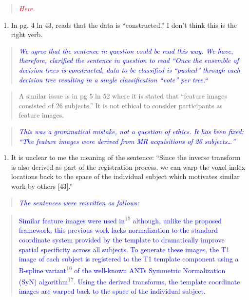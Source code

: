 \documentclass[12pt,]{article}
\providecommand{\tightlist}{%
  \setlength{\itemsep}{0pt}\setlength{\parskip}{0pt}}
\begin{document}
\begin{quote}
\emph{\textcolor{red}{Here.}}
\end{quote}

\begin{enumerate}
\def\labelenumi{\arabic{enumi}.}
\setcounter{enumi}{9}
\tightlist
\item
  In pg. 4 ln 43, reads that the data is ``constructed.'' I don't think
  this is the right verb.
\end{enumerate}

\begin{quote}
\emph{\textcolor{blue}{We agree that the sentence in question could be read this way.
We have, therefore, clarified the sentence in question to read
``Once the ensemble of decision trees is constructed, data to be classified is ``pushed''
through each decision tree resulting in a single classification ``vote'' per tree.``}}
\end{quote}

\begin{quote}
A similar issue is in pg 5 ln 52 where it is stated that ``feature
images consisted of 26 subjects.'' It is not ethical to consider
participants as feature images.
\end{quote}

\begin{quote}
\emph{\textcolor{blue}{This was a grammatical mistake, not a question of
ethics.  It has been fixed: ``The feature images
were derived from MR acquisitions of 26 subjects\ldots''}}
\end{quote}

\begin{enumerate}
\def\labelenumi{\arabic{enumi}.}
\setcounter{enumi}{10}
\tightlist
\item
  It is unclear to me the meaning of the sentence: ``Since the inverse
  transform is also derived as part of the registration process, we can
  warp the voxel index locations back to the space of the individual
  subject which motivates similar work by others {[}43{]}.''
\end{enumerate}

\begin{quote}
\emph{\textcolor{blue}{The sentences were rewritten as follows:}}
\end{quote}

\begin{quote}
\textcolor{blue}{Similar feature images were used in}\textsuperscript{15}
\textcolor{blue}{although, unlike the proposed framework, this previous work lacks
normalization to the standard
coordinate system provided by the template to dramatically improve spatial specificity
across all subjects.  To generate these images, the T1 image of each subject is
registered to the T1 template component using a B-spline variant}\textsuperscript{16}
\textcolor{blue}{of the well-known ANTs Symmetric Normalization (SyN) algorithm}\textsuperscript{17}.
\textcolor{blue}{Using the derived transforms, the template coordinate images are warped back to the space of the individual subject.}
\end{quote}
\end{document}
